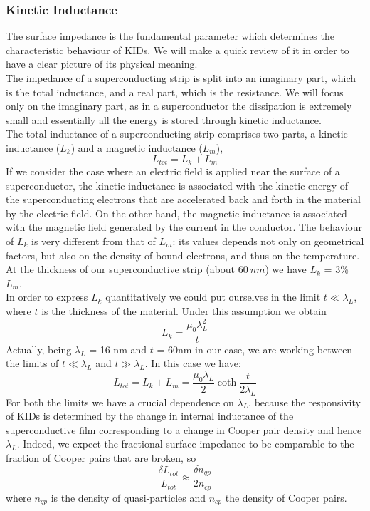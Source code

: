 \documentclass[12pt]{article}
\begin{document}
\subsubsection{Kinetic Inductance}
The surface impedance is the fundamental parameter which determines the characteristic behaviour of KIDs. We will make a quick review of it in order to have a clear picture of its physical meaning.\\
The impedance of a superconducting strip is split into an imaginary part, which is the total inductance, and a real part, which is the resistance. We will focus only on the imaginary part, as in a superconductor the dissipation is extremely small and essentially all the energy is stored through kinetic inductance.\\
The total inductance of a superconducting strip comprises two parts, a kinetic inductance ($L_k$) and a magnetic inductance ($L_m$),
\begin{equation}
    L_{tot} = L_k + L_m
\end{equation}
If we consider the case where an electric field is applied near the surface of a superconductor, the kinetic inductance is associated with the kinetic energy of the superconducting electrons that are accelerated back and forth in the material by the electric field. On the other hand, the magnetic inductance is associated with the magnetic field generated by the current in the conductor. The behaviour of $L_k$ is very different from that of $L_m$: its values depends not only on geometrical factors, but also on the density of bound electrons, and thus on the temperature. At the thickness of our superconductive strip (about $60~nm$) we have $L_k$ = 3\% $L_m$.\\
In order to express $L_k$ quantitatively we could put ourselves in the limit $t \ll \lambda_L$, where $t$ is the thickness of the material. Under this assumption we obtain
\begin{equation}
    L_{k} = \frac{\mu_0\lambda_L^2}{t}
\end{equation}
Actually, being $\lambda_L$ = 16 nm and $t$ = 60nm in our case, we are working between the limits of $t \ll \lambda_L$ and $t \gg \lambda_L$. In this case we have:
\begin{equation}
    L_{tot} = L_k + L_m = \frac{\mu_0\lambda_L}{2}\coth{\frac{t}{2\lambda_L}}
\end{equation}
For both the limits we have a crucial dependence on $\lambda_L$, because the responsivity of KIDs is determined by the change in internal inductance of the superconductive film corresponding to a change in Cooper pair density and hence $\lambda_L$.
Indeed, we expect the fractional surface impedance to be comparable to the fraction of Cooper pairs that are broken, so
\begin{equation}
    \frac{\delta L_{tot}}{L_{tot}} \approx \frac{\delta n_{qp}}{2n_{cp}}
\end{equation}
where $n_{qp}$ is the density of quasi-particles and $n_{cp}$ the density of Cooper pairs.
\end{document}

